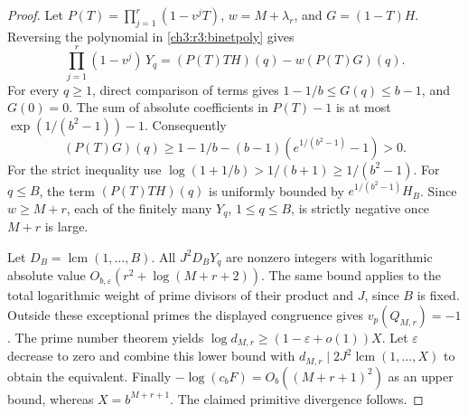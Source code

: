 \documentclass[11pt,a4paper,oneside,openany]{report}
\theoremstyle{remark}\newtheorem{remark}[theorem]{Remark}
\numberwithin{equation}{section}
\begin{document}
\begin{proof}
Let $P(T)=\prod_{j=1}^r(1-v^jT)$, $w=M+\lambda_r$, and
$G=(1-T)H$. Reversing the polynomial in \eqref{ch3:r3:binetpoly} gives
\[
 \prod_{j=1}^r(1-v^j)\,Y_q
       =(P(T)TH)(q)-w(P(T)G)(q).
\]
For every $q\ge1$, direct comparison of terms gives
$1-1/b\le G(q)\le b-1$, and $G(0)=0$. The sum of absolute
coefficients in $P(T)-1$ is at most
$\exp(1/(b^2-1))-1$. Consequently
\[
 (P(T)G)(q)\ge 1-1/b-(b-1)(e^{1/(b^2-1)}-1)>0 .
\]
For the strict inequality use
$\log(1+1/b)>1/(b+1)\ge 1/(b^2-1)$.
For $q\le B$, the term $(P(T)TH)(q)$ is uniformly bounded by
$e^{1/(b^2-1)}H_B$. Since $w\ge M+r$, each of the finitely many
$Y_q$, $1\le q\le B$, is strictly negative once $M+r$ is large.

Let $D_B=\operatorname{lcm}(1,\ldots,B)$. All $J^2D_BY_q$
are nonzero integers with logarithmic absolute value
$O_{b,\varepsilon}(r^2+\log(M+r+2))$. The same bound applies to
the total logarithmic weight of prime divisors of their product
and $J$, since $B$ is fixed. Outside these exceptional primes the
displayed congruence gives $v_p(Q_{M,r})=-1$. The prime number
theorem yields
$\log d_{M,r}\ge(1-\varepsilon+o(1))X$.
Let $\varepsilon$ decrease to zero and combine this lower bound with
$d_{M,r}\mid 2J^2\operatorname{lcm}(1,\dots,X)$ to obtain the
equivalent.
Finally $-\log(c_b F)=O_b((M+r+1)^2)$ as an upper bound,
whereas $X=b^{M+r+1}$. The claimed primitive divergence follows.
\end{proof}
\end{document}
